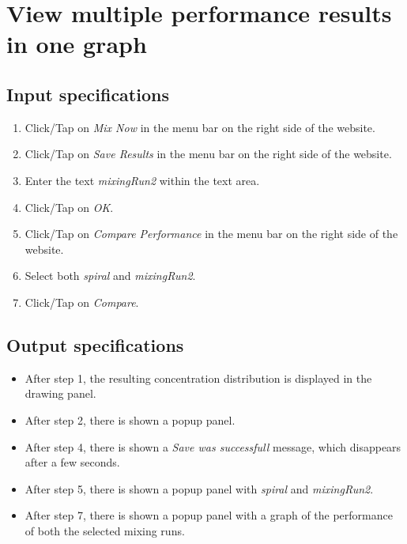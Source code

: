 \section{View multiple performance results in one graph}

\subsection*{Input specifications}
\begin{enumerate}
\item Click/Tap on \emph{Mix Now} in the menu bar on the right side of the website.
\item Click/Tap on \emph{Save Results} in the menu bar on the right side of the website.
\item Enter the text \emph{mixingRun2} within the text area.
\item Click/Tap on \emph{OK}.
\item Click/Tap on \emph{Compare Performance} in the menu bar on the right side of the website.
\item Select both \emph{spiral} and \emph{mixingRun2}.
\item Click/Tap on \emph{Compare}.
\end{enumerate}

\subsection*{Output specifications}
\begin{itemize}
\item After step 1, the resulting concentration distribution is displayed in the drawing panel.
\item After step 2, there is shown a popup panel.
\item After step 4, there is shown a \emph{Save was successfull} message, which disappears after a few seconds.
\item After step 5, there is shown a popup panel with \emph{spiral} and \emph{mixingRun2}.
\item After step 7, there is shown a popup panel with a graph of the performance of both the selected mixing runs.
\end{itemize}

